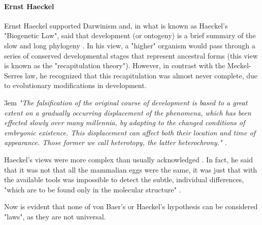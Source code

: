 \begin{mdframed}[style=boxstyle,frametitle={Box2. Haeckel, von Baer and the \textit{Naturphilosophie}}]
\paragraph{Ernst Haeckel}
Ernst Haeckel supported Darwinism and, in what is known as Haeckel's "Biogenetic Law", said that development (or ontogeny) is a brief summary of the slow and long phylogeny \citep{haeckel1874menschen}.
In his view, a "higher" organism would pass through a series of conserved developmental stages that represent ancestral forms (this view is known as the "recapitulation theory").
However, in contrast with the Meckel-Serres law, he recognized that this recapitulation was almost never complete, due to evolutionary modifications in development. 
\begin{flushleft}
\leftskip3em
\rightskip\leftskip
\footnotesize{
\textit{"The falsification of the original course of development is based to a great extent on a gradually occurring displacement of the phenomena, which has been effected slowly over many millennia, by adapting to the changed conditions of embryonic existence. This displacement can affect both their location and time of appearance. Those former we call heterotopy, the latter heterochrony." \citep{haeckel1903anthropogenie}.}}
\end{flushleft}
Haeckel's views were more complex than usually acknowledged \citep{Richardson2002}.
In fact, he said that it was not that all the mammalian eggs were the same, it was just that with the available tools was impossible to detect the subtle, individual differences, "which are to be found only in the molecular structure" \citep{haeckel1903anthropogenie}.

Now is evident that none of von Baer's or Haeckel's hypothesis can be considered "laws", as they are not universal.


\end{mdframed}

